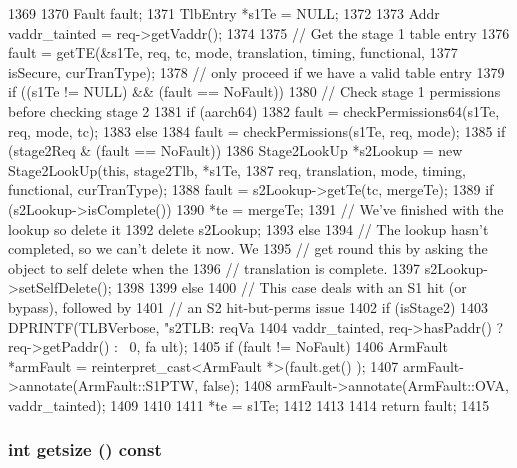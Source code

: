 \begin{DoxyCode}
1369 {
1370     Fault fault;
1371     TlbEntry *s1Te = NULL;
1372 
1373     Addr vaddr_tainted = req->getVaddr();
1374 
1375     // Get the stage 1 table entry
1376     fault = getTE(&s1Te, req, tc, mode, translation, timing, functional,
1377                   isSecure, curTranType);
1378     // only proceed if we have a valid table entry
1379     if ((s1Te != NULL) && (fault == NoFault)) {
1380         // Check stage 1 permissions before checking stage 2
1381         if (aarch64)
1382             fault = checkPermissions64(s1Te, req, mode, tc);
1383         else
1384             fault = checkPermissions(s1Te, req, mode);
1385         if (stage2Req & (fault == NoFault)) {
1386             Stage2LookUp *s2Lookup = new Stage2LookUp(this, stage2Tlb, *s1Te,
1387                 req, translation, mode, timing, functional, curTranType);
1388             fault = s2Lookup->getTe(tc, mergeTe);
1389             if (s2Lookup->isComplete()) {
1390                 *te = mergeTe;
1391                 // We've finished with the lookup so delete it
1392                 delete s2Lookup;
1393             } else {
1394                 // The lookup hasn't completed, so we can't delete it now. We
1395                 // get round this by asking the object to self delete when the
1396                 // translation is complete.
1397                 s2Lookup->setSelfDelete();
1398             }
1399         } else {
1400             // This case deals with an S1 hit (or bypass), followed by
1401             // an S2 hit-but-perms issue
1402             if (isStage2) {
1403                 DPRINTF(TLBVerbose, "s2TLB: reqVa %
1404                         vaddr_tainted, req->hasPaddr() ? req->getPaddr() : ~0, fa
      ult);
1405                 if (fault != NoFault) {
1406                     ArmFault *armFault = reinterpret_cast<ArmFault *>(fault.get()
      );
1407                     armFault->annotate(ArmFault::S1PTW, false);
1408                     armFault->annotate(ArmFault::OVA, vaddr_tainted);
1409                 }
1410             }
1411             *te = s1Te;
1412         }
1413     }
1414     return fault;
1415 }
\end{DoxyCode}
\hypertarget{classArmISA_1_1TLB_ae121404a6cfcf714e05fe2231ce4c7fc}{
\subsubsection[{getsize}]{\setlength{\rightskip}{0pt plus 5cm}int getsize () const}}
\label{classArmISA_1_1TLB_ae121404a6cfcf714e05fe2231ce4c7fc}



